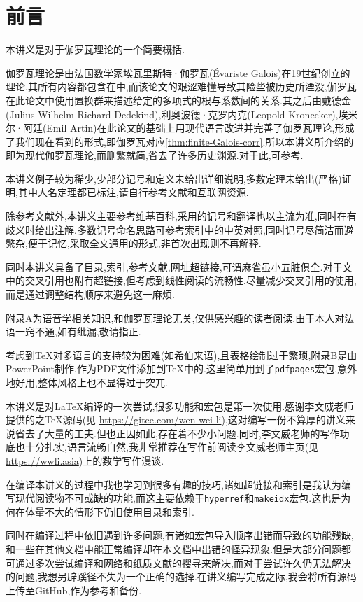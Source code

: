 \chapter{前言}
本讲义是对于伽罗瓦理论的一个简要概括.

伽罗瓦理论是由法国数学家埃瓦里斯特·伽罗瓦(Évariste Galois)在19世纪创立的理论.其所有内容都包含在\cite{Galois}中,而该论文的艰涩难懂导致其险些被历史所湮没,伽罗瓦在此论文中使用置换群来描述给定的多项式的根与系数间的关系.其之后由戴德金(Julius Wilhelm Richard Dedekind),利奥波德·克罗内克(Leopold Kronecker),埃米尔·阿廷(Emil Artin)在此论文的基础上用现代语言改进并完善了伽罗瓦理论,形成了我们现在看到的形式,即伽罗瓦对应\ref{thm:finite-Galois-corr}.所以本讲义所介绍的即为现代伽罗瓦理论,而删繁就简,省去了许多历史渊源.对于此,可参考\cite{Artin}\cite{YH}.

本讲义例子较为稀少,少部分记号和定义未给出详细说明,多数定理未给出(严格)证明,其中人名定理都已标注,请自行参考文献和互联网资源.

除参考文献外,本讲义主要参考维基百科,采用的记号和翻译也以主流为准,同时在有歧义时给出注解.多数记号命名思路可参考索引中的中英对照,同时记号尽简洁而避繁杂,便于记忆,采取全文通用的形式,非首次出现则不再解释.

同时本讲义具备了目录,索引,参考文献,网址超链接,可谓麻雀虽小五脏俱全.对于文中的交叉引用也附有超链接,但考虑到线性阅读的流畅性,尽量减少交叉引用的使用,而是通过调整结构顺序来避免这一麻烦.

附录A为语音学相关知识,和伽罗瓦理论无关,仅供感兴趣的读者阅读.由于本人对法语一窍不通,如有纰漏,敬请指正.

考虑到\TeX 对多语言的支持较为困难(如希伯来语),且表格绘制过于繁琐,附录B是由PowerPoint制作,作为PDF文件添加到\TeX 中的.这里简单用到了\texttt{pdfpages}宏包,意外地好用,整体风格上也不显得过于突兀.

本讲义是对\LaTeX 编译的一次尝试,很多功能和宏包是第一次使用.感谢李文威老师提供的\cite{LW}之\TeX 源码(见 \url{https://gitee.com/wen-wei-li}),这对编写一份不算厚的讲义来说省去了大量的工夫.但也正因如此,存在着不少小问题.同时,李文威老师的写作功底也十分扎实,语言流畅自然,我非常推荐在写作前阅读李文威老师主页(见\url{https://wwli.asia})上的数学写作漫谈.

在编译本讲义的过程中我也学习到很多有趣的技巧,诸如超链接和索引是我认为编写现代阅读物不可或缺的功能,而这主要依赖于\texttt{hyperref}和\texttt{makeidx}宏包.这也是为何在体量不大的情形下仍旧使用目录和索引.

同时在编译过程中依旧遇到许多问题,有诸如宏包导入顺序出错而导致的功能残缺,和一些在其他文档中能正常编译却在本文档中出错的怪异现象.但是大部分问题都可通过多次尝试编译和网络和纸质文献的搜寻来解决,而对于尝试许久仍无法解决的问题,我想另辟蹊径不失为一个正确的选择.在讲义编写完成之际,我会将所有源码上传至GitHub,作为参考和备份.


